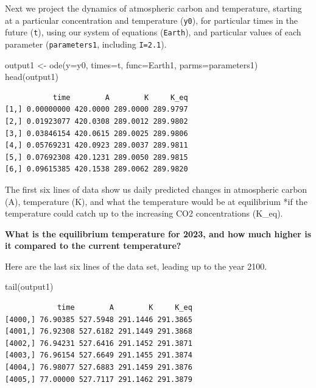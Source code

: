 \documentclass[
  letterpaper,
  DIV=11,
  numbers=noendperiod]{scrreprt}
\newenvironment{Shaded}{\begin{snugshade}}{\end{snugshade}}
\newcommand{\AttributeTok}[1]{\textcolor[rgb]{0.40,0.45,0.13}{#1}}
\newcommand{\FunctionTok}[1]{\textcolor[rgb]{0.28,0.35,0.67}{#1}}
\newcommand{\NormalTok}[1]{\textcolor[rgb]{0.00,0.23,0.31}{#1}}
\newcommand{\OtherTok}[1]{\textcolor[rgb]{0.00,0.23,0.31}{#1}}
\begin{document}
Next we project the dynamics of atmospheric carbon and temperature,
starting at a particular concentration and temperature (\texttt{y0}),
for particular times in the future (\texttt{t}), using our system of
equations (\texttt{Earth}), and particular values of each parameter
(\texttt{parameters1}, including \texttt{I=2.1}).

\begin{Shaded}
\begin{Highlighting}[]
\NormalTok{output1 }\OtherTok{\textless{}{-}} \FunctionTok{ode}\NormalTok{(}\AttributeTok{y=}\NormalTok{y0, }
               \AttributeTok{times=}\NormalTok{t, }
               \AttributeTok{func=}\NormalTok{Earth1, }
               \AttributeTok{parms=}\NormalTok{parameters1)}
\FunctionTok{head}\NormalTok{(output1)}
\end{Highlighting}
\end{Shaded}

\begin{verbatim}
           time        A        K     K_eq
[1,] 0.00000000 420.0000 289.0000 289.9797
[2,] 0.01923077 420.0308 289.0012 289.9802
[3,] 0.03846154 420.0615 289.0025 289.9806
[4,] 0.05769231 420.0923 289.0037 289.9811
[5,] 0.07692308 420.1231 289.0050 289.9815
[6,] 0.09615385 420.1538 289.0062 289.9820
\end{verbatim}

The first six lines of data show us daily predicted changes in
atmospheric carbon (A), temperature (K), and what the temperature would
be at equilibrium *if the temperature could catch up to the increasing
CO2 concentrations (K\_eq).

\textbf{What is the equilibrium temperature for 2023, and how much
higher is it compared to the current temperature?}

Here are the last six lines of the data set, leading up to the year
2100.

\begin{Shaded}
\begin{Highlighting}[]
\FunctionTok{tail}\NormalTok{(output1)}
\end{Highlighting}
\end{Shaded}

\begin{verbatim}
            time        A        K     K_eq
[4000,] 76.90385 527.5948 291.1446 291.3865
[4001,] 76.92308 527.6182 291.1449 291.3868
[4002,] 76.94231 527.6416 291.1452 291.3871
[4003,] 76.96154 527.6649 291.1455 291.3874
[4004,] 76.98077 527.6883 291.1459 291.3876
[4005,] 77.00000 527.7117 291.1462 291.3879
\end{verbatim}
\end{document}
